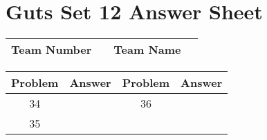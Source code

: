 \documentclass[14pt]{article}
\begin{document}
\vspace{30px}

\section*{Guts Set 12 Answer Sheet}

\begin{center}
\begin{tabular}{|r|r|r|r|}
\hline
	Team Number & \hspace{10em} &
	Team Name & \hspace{15em} \\ \hline
\end{tabular}
\end{center}
\begin{tabularx}{\textwidth}{|c|l|c|X|}\hline
	Problem & Answer & Problem & Answer \\\hline
	34 & \hspace{15em} & 36 & \\\hline
	35 & & & \\\hline
\end{tabularx}
\end{document}
